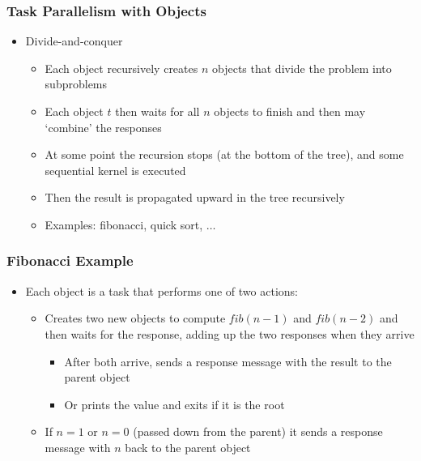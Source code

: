 \begin{frame}[fragile]
  \frametitle{Task Parallelism with Objects}
  \begin{itemize}
    \item Divide-and-conquer
      \begin{itemize}
      \item Each object recursively creates $n$ objects that divide the problem
        into subproblems
      \item Each object $t$ then waits for all $n$ objects to finish and then may
        `combine' the responses
      \item At some point the recursion stops (at the bottom of the tree), and
        some sequential kernel is executed
      \item Then the result is propagated upward in the tree recursively
      \item Examples: fibonacci, quick sort, $\ldots$
      \end{itemize}
  \end{itemize}
\end{frame}

\begin{frame}[fragile]
  \frametitle{Fibonacci Example}
  \begin{itemize}
    \item Each  object is a task that performs one of two actions:
      \begin{itemize}
        \item Creates two new  objects to compute $fib(n-1)$ and
          $fib(n-2)$ and then waits for the response, adding up the two
          responses when they arrive
          \begin{itemize}
          \item After both arrive, sends a response message with the result to
            the parent object
          \item Or prints the value and exits if it is the root
          \end{itemize}
        \item If $n = 1$ or $n = 0$ (passed down from the parent) it sends a
          response message with $n$ back to the parent object
      \end{itemize}
  \end{itemize}
\end{frame}

%   

